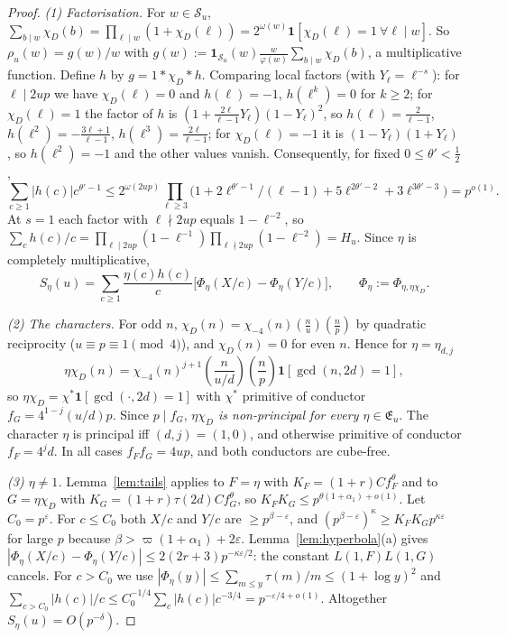 \documentclass[11pt,reqno]{amsart}
\theoremstyle{definition}
\newcommand{\eps}{\varepsilon}
\newcommand{\leg}[2]{\left(\frac{#1}{#2}\right)}
\newcommand{\cE}{\mathfrak E}
\newcommand{\cS}{\mathcal S}
\begin{document}
\begin{proof}
\emph{(1) Factorisation.}  For $w\in\cS_u$,
$\sum_{b\mid w}\chi_D(b)=\prod_{\ell\mid w}(1+\chi_D(\ell))=2^{\omega(w)}
\mathbf 1[\chi_D(\ell)=1\ \forall\ell\mid w]$.  So $\rho_u(w)=g(w)/w$ with
$g(w):=\mathbf 1_{\cS_u}(w)\frac{w}{\varphi(w)}\sum_{b\mid w}\chi_D(b)$, a
multiplicative function.  Define $h$ by $g=1*\chi_D*h$.  Comparing local
factors (with $Y_\ell=\ell^{-s}$): for $\ell\mid2up$ we have
$\chi_D(\ell)=0$ and $h(\ell)=-1$, $h(\ell^k)=0$ for $k\ge2$; for
$\chi_D(\ell)=1$ the factor of $h$ is
$(1+\frac{2\ell}{\ell-1}Y_\ell)(1-Y_\ell)^2$, so $h(\ell)=\frac2{\ell-1}$,
$h(\ell^2)=-\frac{3\ell+1}{\ell-1}$, $h(\ell^3)=\frac{2\ell}{\ell-1}$; for
$\chi_D(\ell)=-1$ it is $(1-Y_\ell)(1+Y_\ell)$, so $h(\ell^2)=-1$ and the
other values vanish.  Consequently, for fixed $0\le\theta'<\frac12$,
\[
 \sum_{c\ge1}|h(c)|c^{\theta'-1}\le2^{\omega(2up)}\prod_{\ell\ge3}
 \bigl(1+2\ell^{\theta'-1}/(\ell-1)+5\ell^{2\theta'-2}+3\ell^{3\theta'-3}\bigr)
 =p^{o(1)}.
\]
At $s=1$ each factor with $\ell\nmid2up$ equals $1-\ell^{-2}$, so
$\sum_ch(c)/c=\prod_{\ell\mid2up}(1-\ell^{-1})\prod_{\ell\nmid2up}(1-\ell^{-2})=H_u$.
Since $\eta$ is completely multiplicative,
\[
 S_\eta(u)=\sum_{c\ge1}\frac{\eta(c)h(c)}c\bigl[\Phi_\eta(X/c)-\Phi_\eta(Y/c)\bigr],
 \qquad\Phi_\eta:=\Phi_{\eta,\eta\chi_D}.
\]

\emph{(2) The characters.}  For odd $n$, $\chi_D(n)=\chi_{-4}(n)\leg
nu\leg np$ by quadratic reciprocity ($u\equiv p\equiv1\pmod 4$), and
$\chi_D(n)=0$ for even $n$.  Hence for $\eta=\eta_{d,j}$
\[
 \eta\chi_D(n)=\chi_{-4}(n)^{j+1}\leg{n}{u/d}\leg np\mathbf 1[\gcd(n,2d)=1],
\]
so $\eta\chi_D=\chi^*\mathbf 1[\gcd(\cdot,2d)=1]$ with $\chi^*$ primitive
of conductor $f_G=4^{1-j}(u/d)p$.  Since $p\mid f_G$, \emph{$\eta\chi_D$ is
non-principal for every $\eta\in\cE_u$}.  The character $\eta$ is
principal iff $(d,j)=(1,0)$, and otherwise primitive of conductor
$f_F=4^jd$.  In all cases $f_Ff_G=4up$, and both conductors are
cube-free.

\emph{(3) $\eta\ne1$.}  Lemma~\ref{lem:tails} applies to $F=\eta$ with
$K_F=(1+r)Cf_F^\theta$ and to $G=\eta\chi_D$ with
$K_G=(1+r)\tau(2d)Cf_G^\theta$, so $K_FK_G\le p^{\theta(1+\alpha_1)+o(1)}$.
Let $C_0=p^\eps$.  For $c\le C_0$ both $X/c$ and $Y/c$ are $\ge
p^{\beta-\eps}$, and $(p^{\beta-\eps})^\kappa\ge K_FK_Gp^{\kappa\eps}$ for
large $p$ because $\beta>\varpi(1+\alpha_1)+2\eps$.  Lemma~\ref{lem:hyperbola}(a)
gives $|\Phi_\eta(X/c)-\Phi_\eta(Y/c)|\le2(2r+3)p^{-\kappa\eps/2}$: the
constant $L(1,F)L(1,G)$ cancels.  For $c>C_0$ we use
$|\Phi_\eta(y)|\le\sum_{m\le y}\tau(m)/m\le(1+\log y)^2$ and
$\sum_{c>C_0}|h(c)|/c\le C_0^{-1/4}\sum_c|h(c)|c^{-3/4}=p^{-\eps/4+o(1)}$.
Altogether $S_\eta(u)=O(p^{-\delta})$.


\end{proof}
\end{document}
